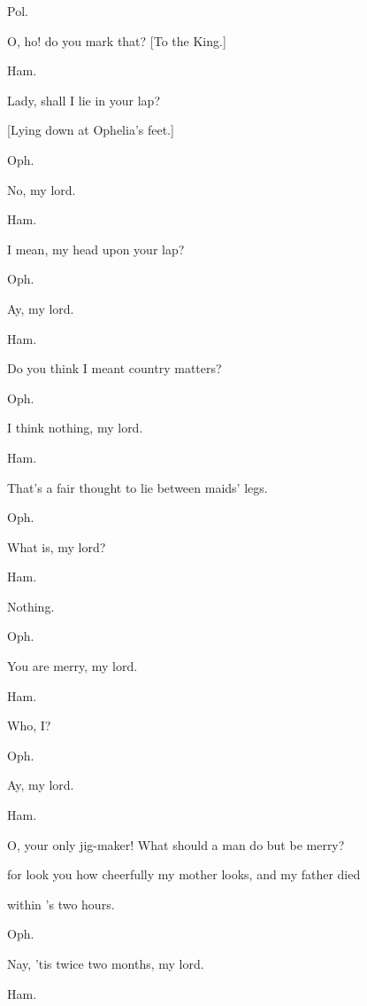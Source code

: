 \documentclass[12pt]{book}
\begin{document}
Pol.

O, ho! do you mark that? [To the King.]



Ham.

Lady, shall I lie in your lap?

[Lying down at Ophelia's feet.]



Oph.

No, my lord.



Ham.

I mean, my head upon your lap?



Oph.

Ay, my lord.



Ham.

Do you think I meant country matters?



Oph.

I think nothing, my lord.



Ham.

That's a fair thought to lie between maids' legs.



Oph.

What is, my lord?



Ham.

Nothing.



Oph.

You are merry, my lord.



Ham.

Who, I?



Oph.

Ay, my lord.



Ham.

O, your only jig-maker! What should a man do but be merry?

for look you how cheerfully my mother looks, and my father died

within 's two hours.



Oph.

Nay, 'tis twice two months, my lord.



Ham.
\end{document}
